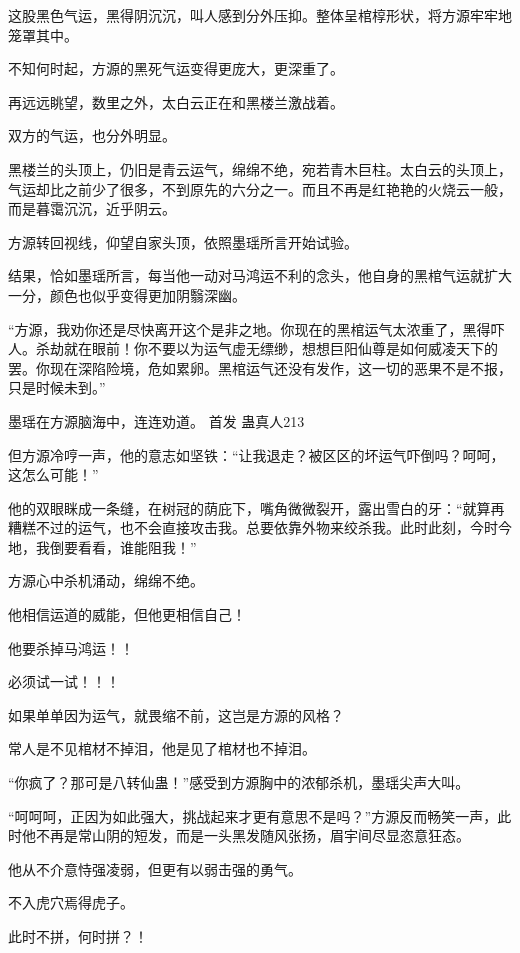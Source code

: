 
\begin{this_body}

这股黑色气运，黑得阴沉沉，叫人感到分外压抑。整体呈棺椁形状，将方源牢牢地笼罩其中。

不知何时起，方源的黑死气运变得更庞大，更深重了。

再远远眺望，数里之外，太白云正在和黑楼兰激战着。

双方的气运，也分外明显。

黑楼兰的头顶上，仍旧是青云运气，绵绵不绝，宛若青木巨柱。太白云的头顶上，气运却比之前少了很多，不到原先的六分之一。而且不再是红艳艳的火烧云一般，而是暮霭沉沉，近乎阴云。

方源转回视线，仰望自家头顶，依照墨瑶所言开始试验。

结果，恰如墨瑶所言，每当他一动对马鸿运不利的念头，他自身的黑棺气运就扩大一分，颜色也似乎变得更加阴翳深幽。

“方源，我劝你还是尽快离开这个是非之地。你现在的黑棺运气太浓重了，黑得吓人。杀劫就在眼前！你不要以为运气虚无缥缈，想想巨阳仙尊是如何威凌天下的罢。你现在深陷险境，危如累卵。黑棺运气还没有发作，这一切的恶果不是不报，只是时候未到。”

墨瑶在方源脑海中，连连劝道。  首发 蛊真人213

但方源冷哼一声，他的意志如坚铁：“让我退走？被区区的坏运气吓倒吗？呵呵，这怎么可能！”

他的双眼眯成一条缝，在树冠的荫庇下，嘴角微微裂开，露出雪白的牙：“就算再糟糕不过的运气，也不会直接攻击我。总要依靠外物来绞杀我。此时此刻，今时今地，我倒要看看，谁能阻我！”

方源心中杀机涌动，绵绵不绝。

他相信运道的威能，但他更相信自己！

他要杀掉马鸿运！！

必须试一试！！！

如果单单因为运气，就畏缩不前，这岂是方源的风格？

常人是不见棺材不掉泪，他是见了棺材也不掉泪。

“你疯了？那可是八转仙蛊！”感受到方源胸中的浓郁杀机，墨瑶尖声大叫。

“呵呵呵，正因为如此强大，挑战起来才更有意思不是吗？”方源反而畅笑一声，此时他不再是常山阴的短发，而是一头黑发随风张扬，眉宇间尽显恣意狂态。

他从不介意恃强凌弱，但更有以弱击强的勇气。

不入虎穴焉得虎子。

此时不拼，何时拼？！


\end{this_body}
